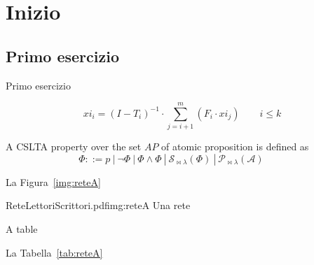 
\section{Inizio}  \label{sec:inizio}

\subsection{Primo esercizio}  \label{ssec:primo}
Primo esercizio

\begin{equation} \label{eq:xii}
	xi_i = (I - T_i)^{-1} \cdot
			\sum^m_{j=i+1} (F_i \cdot xi_j) \qquad i \leq k
\end{equation}%


A CSLTA  property over the set $AP$ of atomic proposition is defined as
\begin{equation} 
	\Phi ::= p ~|~ \neg\Phi ~|~ \Phi \wedge \Phi ~|~ 
			 \mathcal{S}_{\bowtie\lambda}(\Phi)  ~|~
			 \mathcal{P}_{\bowtie\lambda}(\mathcal{A})  \qquad~
\end{equation}



La Figura~\ref{img:reteA}  

{ReteLettoriScrittori.pdf}{img:reteA}
	{Una rete}



\begin{table}
	\centering
	\caption{A table}
	\label{tab:reteA}
\end{table}

La Tabella~\ref{tab:reteA} 



